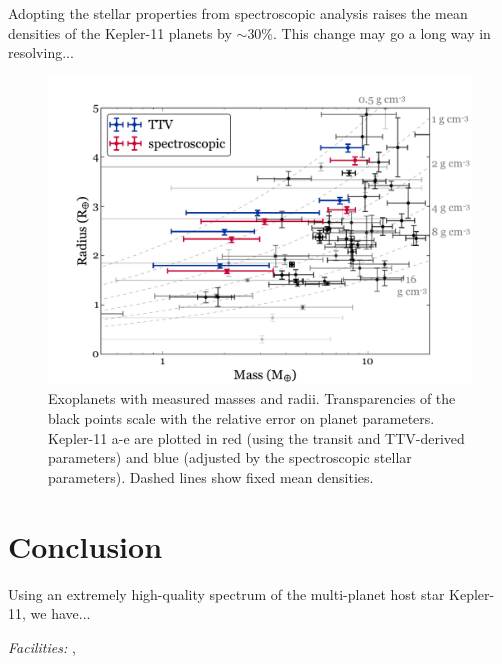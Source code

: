 \documentclass[oneside]{emulateapj}
\begin{document}
Adopting the stellar properties from spectroscopic analysis raises the mean densities of the Kepler-11 planets by $\sim$30\%. This change may go a long way in resolving... 

\begin{figure}
\centering
\includegraphics[width=\columnwidth]{K11_massradius}
\caption{Exoplanets with measured masses and radii. Transparencies of the black points scale with the relative error on planet parameters. Kepler-11 a-e are plotted in red (using the transit and TTV-derived parameters) and blue (adjusted by the spectroscopic stellar parameters). Dashed lines show fixed mean densities.}
\label{fig:mr}
\end{figure}


\section{Conclusion}

Using an extremely high-quality spectrum of the multi-planet host star Kepler-11, we have... 

\bigskip
{}

{\it Facilities:} , 




\end{document}

